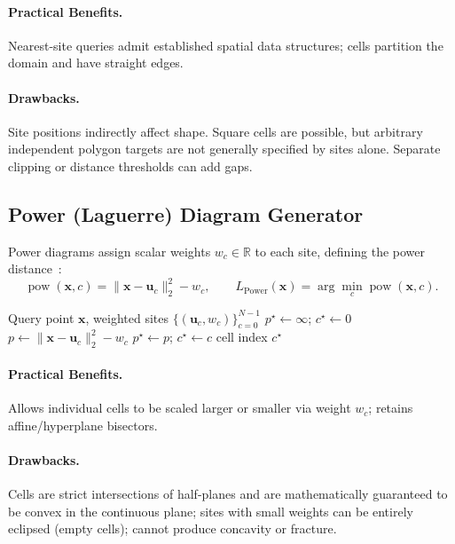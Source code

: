 \documentclass[sigconf,nonacm]{acmart}
\begin{document}
\paragraph{Practical Benefits.} Nearest-site queries admit established
spatial data structures; cells partition the domain and have straight edges.
\paragraph{Drawbacks.} Site positions indirectly affect shape. Square cells
are possible, but arbitrary independent polygon targets are not generally
specified by sites alone. Separate clipping or distance thresholds can add gaps.

\subsection{Power (Laguerre) Diagram Generator}

Power diagrams assign scalar weights $w_c \in \mathbb{R}$ to each site, defining
the power distance~\cite{aurenhammer1987power}:
\begin{equation}
\operatorname{pow}(\mathbf{x}, c) = \lVert \mathbf{x} - \mathbf{u}_c \rVert_2^2 - w_c,
\qquad
L_{\text{Power}}(\mathbf{x}) = \arg\min_c \operatorname{pow}(\mathbf{x}, c).
\end{equation}

\begin{algorithm}[H]
\caption{Power (Laguerre) Diagram Generator}
\begin{algorithmic}[1]
\Require Query point $\mathbf{x}$, weighted sites $\{(\mathbf{u}_c, w_c)\}_{c=0}^{N-1}$
\State $p^\star \gets \infty$;\; $c^\star \gets 0$
  \State $p \gets \lVert \mathbf{x} - \mathbf{u}_c \rVert_2^2 - w_c$
    \State $p^\star \gets p$;\; $c^\star \gets c$
  \EndIf
\EndFor
\State \Return cell index $c^\star$
\end{algorithmic}
\end{algorithm}

\paragraph{Practical Benefits.} Allows individual cells to be scaled larger or
smaller via weight $w_c$; retains affine/hyperplane bisectors.
\paragraph{Drawbacks.} Cells are strict intersections of half-planes and are
mathematically guaranteed to be convex in the continuous plane; sites with small
weights can be entirely eclipsed (empty cells); cannot produce concavity or
fracture.
\end{document}

